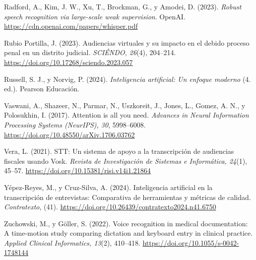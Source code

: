\documentclass[12pt,a4paper,oneside]{report}
\begin{document}
\vspace{6pt}
Radford, A., Kim, J. W., Xu, T., Brockman, G., y Amodei, D. (2023). \textit{Robust speech recognition via large-scale weak supervision}. OpenAI. \url{https://cdn.openai.com/papers/whisper.pdf}

\vspace{6pt}
Rubio Portilla, J. (2023). Audiencias virtuales y su impacto en el debido proceso penal en un distrito judicial. \textit{SCIÉNDO, 26}(4), 204--214. \url{https://doi.org/10.17268/sciendo.2023.057}

\vspace{6pt}
Russell, S. J., y Norvig, P. (2024). \textit{Inteligencia artificial: Un enfoque moderno} (4.\textordfeminine{} ed.). Pearson Educación.

\vspace{6pt}
Vaswani, A., Shazeer, N., Parmar, N., Uszkoreit, J., Jones, L., Gomez, A. N., y Polosukhin, I. (2017). Attention is all you need. \textit{Advances in Neural Information Processing Systems (NeurIPS), 30}, 5998--6008. \url{https://doi.org/10.48550/arXiv.1706.03762}

\vspace{6pt}
Vera, L. (2021). STT: Un sistema de apoyo a la transcripción de audiencias fiscales usando Vosk. \textit{Revista de Investigación de Sistemas e Informática, 24}(1), 45--57. \url{https://doi.org/10.15381/risi.v14i1.21864}

\vspace{6pt}
Yépez-Reyes, M., y Cruz-Silva, A. (2024). Inteligencia artificial en la transcripción de entrevistas: Comparativa de herramientas y métricas de calidad. \textit{Contratexto}, (41). \url{https://doi.org/10.26439/contratexto2024.n41.6750}

\vspace{6pt}
Zuchowski, M., y Göller, S. (2022). Voice recognition in medical documentation: A time-motion study comparing dictation and keyboard entry in clinical practice. \textit{Applied Clinical Informatics, 13}(2), 410--418. \url{https://doi.org/10.1055/s-0042-1748144}
\end{document}
